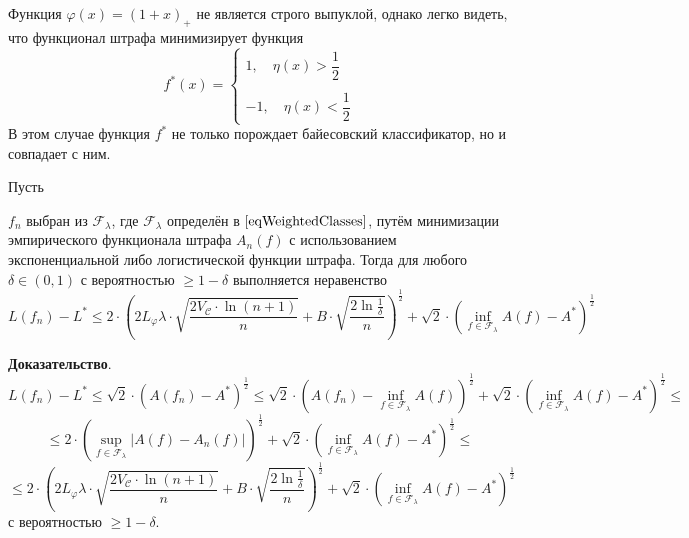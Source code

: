 \documentclass[12pt]{article}
\newtheorem{theorem}{\hskip\parindent Теорема}%
\begin{document}
Функция $\varphi(x)=(1+x)_+$ не является строго выпуклой, однако легко видеть, что функционал штрафа минимизирует функция
\begin{equation*}
	f^*(x)=\begin{cases}
		1, \quad \eta(x)>\dfrac{1}{2}\\ \\
		-1, \quad \eta(x)<\dfrac{1}{2}
	\end{cases}
\end{equation*}
В этом случае функция $f^*$ не только порождает байесовский классификатор, но и совпадает с ним.
\begin{theorem}
	Пусть 
	
	\noindent$f_n$ выбран из $\mathcal{F}_\lambda$, где $\mathcal{F}_\lambda$ определён в $\eqref{eqWeightedClasses}$, путём минимизации эмпирического функционала штрафа $A_n(f)$ с использованием экспоненциальной либо логистической функции штрафа. Тогда для любого $\delta\in(0,1)$ с вероятностью $\geqslant1-\delta$ выполняется неравенство
	\begin{equation*}
		L(f_n)-L^*\leqslant2\cdot\left(2L_\varphi\lambda\cdot\sqrt{\frac{2V_\mathcal{C}\cdot\ln(n+1)}{n}}+B\cdot\sqrt{\frac{2\ln\frac{1}{\delta}}{n}}\right)^{\frac{1}{2}}+\sqrt{2}\cdot\left(\inf\limits_{f\in\mathcal{F}_\lambda}A(f)-A^*\right)^{\frac{1}{2}}
	\end{equation*}
\end{theorem}

\textbf{Доказательство}.
\begin{equation*}
	L(f_n)-L^*\leqslant\sqrt{2}\cdot\left(A(f_n)-A^*\right)^{\frac{1}{2}}\leqslant\sqrt{2}\cdot\left(A(f_n)-\inf\limits_{f\in\mathcal{F}_\lambda}A(f)\right)^{\frac{1}{2}}+\sqrt{2}\cdot\left(\inf\limits_{f\in\mathcal{F}_\lambda}A(f)-A^*\right)^{\frac{1}{2}}\leqslant
\end{equation*}
\begin{equation*}
	\leqslant2\cdot\left(\sup\limits_{f\in\mathcal{F}_\lambda}|A(f)-A_n(f)|\right)^{\frac{1}{2}}+\sqrt{2}\cdot\left(\inf\limits_{f\in\mathcal{F}_\lambda}A(f)-A^*\right)^{\frac{1}{2}}\leqslant
\end{equation*}
\begin{equation*}
	\leqslant2\cdot\left(2L_\varphi\lambda\cdot\sqrt{\frac{2V_\mathcal{C}\cdot\ln(n+1)}{n}}+B\cdot\sqrt{\frac{2\ln\frac{1}{\delta}}{n}}\right)^{\frac{1}{2}}+\sqrt{2}\cdot\left(\inf\limits_{f\in\mathcal{F}_\lambda}A(f)-A^*\right)^{\frac{1}{2}}
\end{equation*}
с вероятностью $\geqslant1-\delta$.
\end{document}
